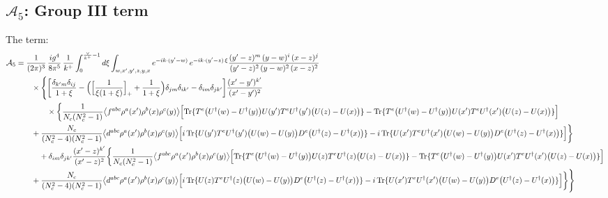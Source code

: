 \documentclass[10pt]{article}
\begin{document}
\subsection*{$\mathcal{A}_{5}$: Group III term}
\noindent The term:
\begin{align}
\mathcal{A}_{5}&=\frac{1}{(2\pi)^{3}}\,\frac{ig^{4}}{8\pi^{5}}\,\frac{1}{k^{+}}\int_{0}^{\frac{\vee}{k^{+}}-1}d\xi\int_{w,x',y',z,y,x}e^{-ik\cdot(y'-w)}\,e^{-ik\cdot(y'-z)\,\xi}\frac{(y'-z)^{m}\,(y-w)^{i}\,(x-z)^{j}}{(y'-z)^{2}\,(y-w)^{2}\,(x-z)^{2}}\notag\\
&\qquad\times\Bigg\{\bigg[\frac{\delta_{k'm}\delta_{ij}}{1+\xi}-\Big(\Big[\frac{1}{\xi(1+\xi)}\Big]_{+}+\frac{1}{1+\xi}\Big)\delta_{jm}\delta_{ik'}-\delta_{im}\delta_{jk'}\bigg]\frac{(x'-y')^{k'}}{(x'-y')^{2}}\notag\\
&\qquad\qquad\times\bigg\{\frac{1}{N_{c}(N_{c}^{2}-1)}\big\langle f^{abc}\rho^{a}(x')\rho^{b}(x)\rho^{c}(y)\big\rangle\Big[{\rm Tr}\{T^{e}\big(U^{\dagger}(w)-U^{\dagger}(y)\big)U(y')T^{e}U^{\dagger}(y')\big(U(z)-U(x)\big)\}-{\rm Tr}\{T^{e}\big(U^{\dagger}(w)-U^{\dagger}(y)\big)U(x')T^{e}U^{\dagger}(x')\big(U(z)-U(x)\big)\}\Big]\notag\\&\qquad+\frac{N_{c}}{(N_{c}^{2}-4)(N_{c}^{2}-1)}\big\langle d^{abc}\rho^{a}(x')\rho^{b}(x)\rho^{c}(y)\big\rangle\Big[i\,{\rm Tr}\{U(y')T^{e}U^{\dagger}(y')\big(U(w)-U(y)\big)D^{e}\big(U^{\dagger}(z)-U^{\dagger}(x)\big)\}-i\,{\rm Tr}\{U(x')T^{e}U^{\dagger}(x')\big(U(w)-U(y)\big)D^{e}\big(U^{\dagger}(z)-U^{\dagger}(x)\big)\}\Big]\bigg\}\notag\\
&\qquad\quad+\delta_{im}\delta_{jk'}\frac{(x'-z)^{k'}}{(x'-z)^{2}}\bigg\{\frac{1}{N_{c}(N_{c}^{2}-1)}\big\langle f^{abc}\rho^{a}(x')\rho^{b}(x)\rho^{c}(y)\big\rangle\Big[{\rm Tr}\{T^{e}\big(U^{\dagger}(w)-U^{\dagger}(y)\big)U(z)T^{e}U^{\dagger}(z)\big(U(z)-U(x)\big)\}-{\rm Tr}\{T^{e}\big(U^{\dagger}(w)-U^{\dagger}(y)\big)U(x')T^{e}U^{\dagger}(x')\big(U(z)-U(x)\big)\}\Big]\notag\\&\qquad+\frac{N_{c}}{(N_{c}^{2}-4)(N_{c}^{2}-1)}\big\langle d^{abc}\rho^{a}(x')\rho^{b}(x)\rho^{c}(y)\big\rangle\Big[i\,{\rm Tr}\{U(z)T^{e}U^{\dagger}(z)\big(U(w)-U(y)\big)D^{e}\big(U^{\dagger}(z)-U^{\dagger}(x)\big)\}-i\,{\rm Tr}\{U(x')T^{e}U^{\dagger}(x')\big(U(w)-U(y)\big)D^{e}\big(U^{\dagger}(z)-U^{\dagger}(x)\big)\}\Big]\bigg\}\Bigg\}
\end{align}
\end{document}
